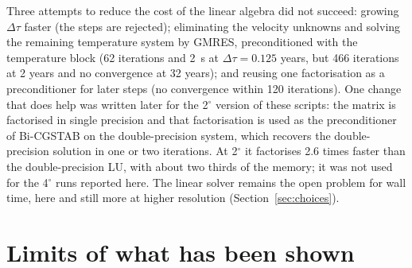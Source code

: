 \documentclass{article}
\begin{document}
Three attempts to reduce the cost of the linear algebra did not succeed: growing $\Delta\tau$ faster (the steps are rejected); eliminating the velocity unknowns and solving the remaining temperature system by GMRES, preconditioned with the temperature block (62 iterations and 2~s at $\Delta\tau=0.125$ years, but 466 iterations at 2 years and no convergence at 32 years); and reusing one factorisation as a preconditioner for later steps (no convergence within 120 iterations). One change that does help was written later for the 2$^\circ$ version of these scripts: the matrix is factorised in single precision and that factorisation is used as the preconditioner of Bi-CGSTAB on the double-precision system, which recovers the double-precision solution in one or two iterations. At 2$^\circ$ it factorises 2.6 times faster than the double-precision LU, with about two thirds of the memory; it was not used for the 4$^\circ$ runs reported here. The linear solver remains the open problem for wall time, here and still more at higher resolution (Section~\ref{sec:choices}).

\section{Limits of what has been shown}\label{sec:limits}
\end{document}
